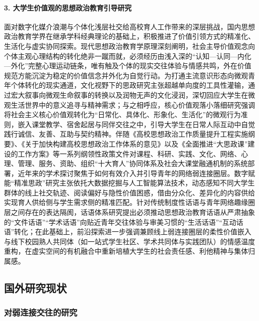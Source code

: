 \paragraph{3. 大学生价值观的思想政治教育引导研究}
面对数字化媒介浪潮与个体化浅层社交给高校育人工作带来的深层挑战，国内思想政治教育学界在继承学科经典理论的基础上，积极推进了价值引领方式的精准化、生活化与虚实协同探索。现代思想政治教育学原理深刻阐明，社会主导价值观念向个体主观心理结构的转化绝非一蹴而就，必须经历由浅入深的“认知—认同—内化—外化”完整心理运动链条，唯有触及个体的现实交往体验与情感共鸣，外在价值规范方能沉淀为稳定的价值信念并外化为自觉行动\cite{Zhang2006}。为打通主流意识形态向微观青年个体转化的现实通道，文化视野下的思政研究主张超越单向度的工具性灌输，通过宏大叙事向微观生命叙事的转换以及润物无声的文化浸润，深切回应大学生在微观生活世界中的意义追寻与精神需求\cite{Shen2013}；与之相呼应，核心价值观落小落细研究强调将社会主义核心价值观转化为“日常化、具体化、形象化、生活化”的微观行为准则，嵌入课堂教学、宿舍起居与同伴交往之中，引导大学生在日常人际互动中自觉践行诚信、友善、互助与契约精神\cite{Liu2016}。伴随《高校思想政治工作质量提升工程实施纲要》\cite{MOE2017_Gangyao}、《关于加快构建高校思想政治工作体系的意见》\cite{MOE2020_Gangshen}以及《全面推进“大思政课”建设的工作方案》\cite{MOE2022_Fangan}等一系列纲领性政策文件对课程、科研、实践、文化、网络、心理、管理、服务、资助、组织“十大育人”协同体系及社会大课堂融通机制的系统部署，近年来的学术探讨聚焦于如何有效介入并引导青年的网络弱连接圈层。数字赋能“精准思政”研究主张依托大数据挖掘与人工智能算法技术，动态感知不同大学生群体的线上社交轨迹、阅读偏好与隐性价值困惑，借由分众化、差异化的内容供给实现育人供给侧与学生需求侧的精准匹配\cite{Luo2022}。针对传统制度性话语与青年网络趣缘圈层之间存在的表达隔阂，话语体系研究提出必须推动思想政治教育话语从严肃抽象的“文件话语”“学术话语”向贴近青年交往体验与审美习惯的“生活话语”“互动话语”转化\cite{Dai2021}；在此基础上，前沿探索进一步强调兼顾线上弱连接圈层的柔性价值嵌入与线下校园熟人共同体（如一站式学生社区、学术共同体与实践团队）的情感温度重构，在虚实空间的有机融合中重新培植大学生的社会责任感、利他精神与集体归属感\cite{Yang2023}。

\subsection{国外研究现状}
\label{sec:international-research}

\subsubsection{对弱连接交往的研究}

